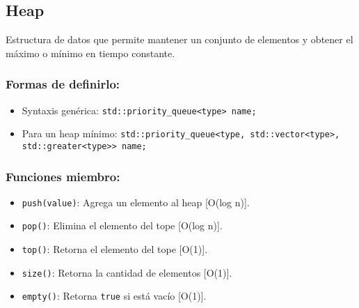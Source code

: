 \subsection{Heap}
\label{subsec:heap}
Estructura de datos que permite mantener un conjunto de elementos y obtener el máximo o mínimo en tiempo constante. 

\subsubsection{Formas de definirlo:}
\begin{itemize}
  \item Syntaxis genérica: \texttt{std::priority\_queue<type> name;}
  \item Para un heap mínimo: \texttt{std::priority\_queue<type, std::vector<type>, std::greater<type>> name;}
\end{itemize}

\subsubsection{Funciones miembro:}
\begin{itemize}
  \item \texttt{push(value)}: Agrega un elemento al heap [O(log n)].
  \item \texttt{pop()}: Elimina el elemento del tope [O(log n)].
  \item \texttt{top()}: Retorna el elemento del tope [O(1)].
  \item \texttt{size()}: Retorna la cantidad de elementos [O(1)].
  \item \texttt{empty()}: Retorna \texttt{true} si está vacío [O(1)]. 
\end{itemize}
